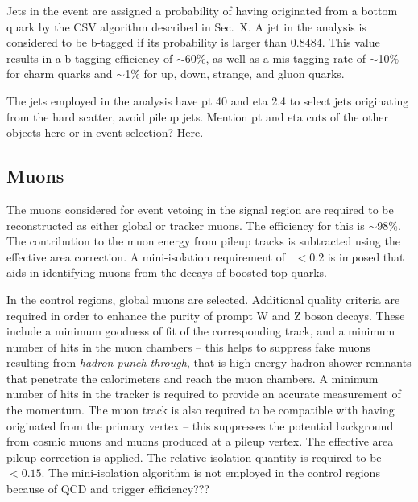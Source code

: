Jets in the event are assigned a probability of having originated from a bottom 
quark by the CSV algorithm described in Sec.~X. A jet in the analysis is 
considered to be b-tagged if its probability is larger than $0.8484$. This 
value 
results in a b-tagging efficiency of $\sim$60\%, as well as a mis-tagging rate 
of $\sim$10\% for charm quarks and $\sim$1\% for up, down, strange, and gluon 
quarks.

The jets employed in the analysis have pt 40 and eta 2.4 to select jets 
originating from the hard scatter, avoid pileup jets. Mention pt and eta cuts 
of the other objects here or in event selection? Here.

\subsection*{Muons}

The muons considered for event vetoing in the signal region are required to be 
reconstructed as either global or tracker muons. The efficiency for this is 
$\sim98$\%. The contribution to the muon energy from pileup tracks is 
subtracted using the effective area correction. A mini-isolation requirement of 
\miniiso~$ < 0.2$ is imposed that aids in identifying muons from the decays of 
boosted top quarks.

In the control regions, global muons are selected. Additional quality criteria 
are required in order to enhance the purity of prompt W and Z boson decays. 
These include a minimum goodness of fit of the corresponding track, and a 
minimum number of hits in the muon chambers -- this helps to suppress fake 
muons resulting from \textit{hadron punch-through}, that is high energy hadron 
shower remnants that penetrate the calorimeters and reach the muon chambers. A 
minimum number of hits in the 
tracker is required to provide an accurate measurement of the momentum. The 
muon track is also required to be compatible with having originated from the 
primary vertex -- this suppresses the potential background from cosmic muons 
and muons produced at a pileup vertex. The effective area pileup correction is 
applied. The relative isolation quantity is required to be \reliso~$ < 0.15$. 
The mini-isolation algorithm is not employed in the control regions because of 
QCD and trigger efficiency???

